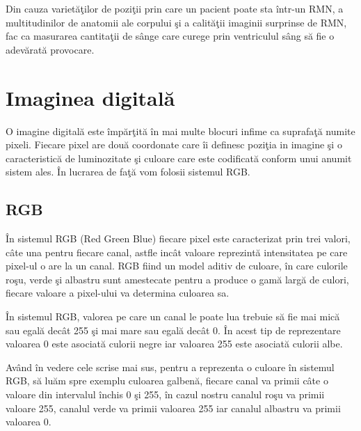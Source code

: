 \par

Din cauza variet\u{a}\c{t}ilor de pozi\c{t}ii prin care un pacient poate sta \^{i}ntr-un RMN, a multitudinilor de anatomii ale corpului \c{s}i a calit\u{a}\c{t}ii imaginii surprinse de RMN, fac ca masurarea cantita\c{t}ii de s\^{a}nge care curege prin ventriculul s\^{a}ng s\u{a} fie o adev\u{a}rat\u{a} provocare.

\section{Imaginea digital\u{a}}

O imagine digital\u{a} este \^{i}mp\u{a}r\c{t}it\u{a} \^{i}n mai multe blocuri infime ca suprafa\c{t}\u{a} numite pixeli. Fiecare pixel are dou\u{a} coordonate care \^{i}i definesc pozi\c{t}ia in imagine \c{s}i o caracteristic\u{a} de luminozitate \c{s}i culoare care este codificat\u{a} conform unui anumit sistem ales. \^{I}n lucrarea de fa\c{t}\u{a} vom folosii sistemul RGB.

\subsection{RGB}

\^{I}n sistemul RGB (Red Green Blue) fiecare pixel este caracterizat prin trei valori, c\^{a}te una pentru fiecare canal, astfle inc\^{a}t valoare reprezint\u{a} intensitatea pe care pixel-ul o are la un canal. RGB fiind un model aditiv de culoare, \^{i}n care culorile ro\c{s}u, verde \c{s}i albastru sunt amestecate pentru a produce o gam\u{a} larg\u{a} de culori, fiecare valoare a pixel-ului va determina culoarea sa.

\par

\^{I}n sistemul RGB, valorea pe care un canal le poate lua trebuie s\u{a} fie mai mic\u{a} sau egal\u{a} dec\^{a}t 255 \c{s}i mai mare sau egal\u{a} dec\^{a}t 0. \^{I}n acest tip de reprezentare valoarea 0 este asociat\u{a} culorii negre iar valoarea 255 este asociat\u{a} culorii albe. 

\par

Av\^{a}nd \^{i}n vedere cele scrise mai sus, pentru a reprezenta o culoare \^{i}n sistemul RGB, s\u{a} lu\u{a}m spre exemplu culoarea galben\u{a}, fiecare canal va primii c\^{a}te o valoare din intervalul \^{i}nchis 0 \c{s}i 255, \^{i}n cazul nostru canalul ro\c{s}u va primii valoare 255, canalul verde va primii valoarea 255 iar canalul albastru va primii valoarea 0.

